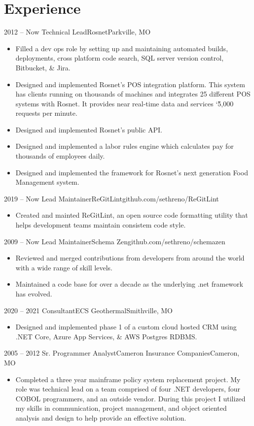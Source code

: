 \documentclass[11pt,letterpaper,final]{moderncv}
\begin{document}
\section{Experience} 
	\cventry
{2012 -- Now} {Technical Lead}{Rosnet}{Parkville, MO}{}{
		\begin{itemize}
			\item
				Filled a dev ops role by setting up and maintaining
				automated builds, deployments, cross platform code
				search, SQL server version control, Bitbucket, \& Jira.
			\item
				Designed and implemented Rosnet's POS integration
				platform. This system has clients running on thousands of
				machines and integrates 25 different POS systems with
				Rosnet. It provides near real-time data and services
				\char`\~5,000 requests per minute.
			\item
				Designed and implemented Rosnet's public API.
			\item
				Designed and implemented a labor rules engine which
				calculates pay for thousands of employees daily.
			\item
				Designed and implemented the framework for Rosnet's next
				generation Food Management system.
		\end{itemize}
}
	\cventry
{2019 -- Now} {Lead Maintainer}{ReGitLint}{github.com/sethreno/ReGitLint}{}{
		\begin{itemize}
			\item 
				Created and mainted ReGitLint, an open source code formatting
				utility that helps development teams maintain consistem code
				style.
		\end{itemize}
}
	\cventry
{2009 -- Now} {Lead Maintainer}{Schema Zen}{github.com/sethreno/schemazen}{}{
		\begin{itemize}
			\item 
				Reviewed and merged contributions from developers from around the world
				with a wide range of skill levels.
			\item 
				Maintained a code base for over a decade as the underlying .net
				framework has evolved.
		\end{itemize}
}
	\cventry
{2020 -- 2021} {Consultant}{ECS Geothermal}{Smithville, MO}{}{
		\begin{itemize}
			\item 
				Designed and implemented phase 1 of a custom cloud hosted CRM
				using .NET Core, Azure App Services, \& AWS Postgres RDBMS.
		\end{itemize}
}
	\cventry
{2005 -- 2012} {Sr. Programmer Analyst}{Cameron Insurance Companies}{Cameron, MO}{}{
		\begin{itemize}
			\item 
				Completed a three year mainframe policy system
				replacement project. My role was technical lead on a
				team comprised of four .NET developers, four COBOL
				programmers, and an outside vendor. During this project
				I utilized my skills in communication, project
				management, and object oriented analysis and design to
				help provide an effective solution.
		\end{itemize}
}
\end{document}
